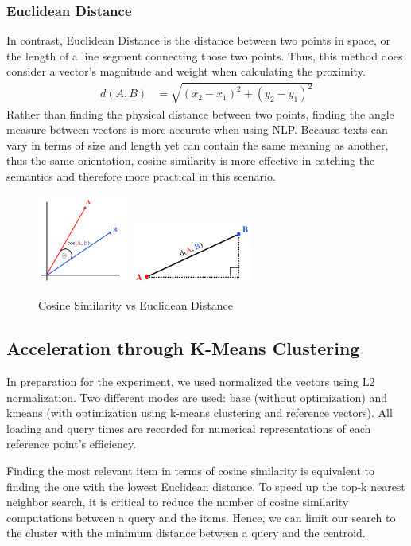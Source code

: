 \documentclass[11pt, a4paper, twocolumn]{article}
\begin{document}
\subsubsection{Euclidean Distance}
In contrast, Euclidean Distance is the distance between two points in space, or the length of a line segment connecting those two points. Thus, this method does consider a vector's magnitude and weight when calculating the proximity.
\begin{align} 
\label{eu}
d(A, B) &= \sqrt{(x_2-x_1)^2 + (y_2-y_1)^2}\nonumber
\end{align}
Rather than finding the physical distance between two points,  finding the angle measure between vectors is more accurate when using NLP. Because texts can vary in terms of size and length yet can contain the same meaning as another, thus the same orientation, cosine similarity is more effective in catching the semantics and therefore more practical in this scenario.
\begin{figure}[htp]
    \centering
    \includegraphics[width=3cm]{cos_sim.png}
    \includegraphics[width=4cm]{eu_dist.png}
    \caption{Cosine Similarity vs Euclidean Distance}
    \label{fig:cos_vs_eu}
\end{figure}
\subsection{Acceleration through K-Means Clustering} 
In preparation for the experiment, we used normalized the vectors using L2 normalization. Two different modes are used: base (without optimization) and kmeans (with optimization using k-means clustering and reference vectors). All loading and query times are recorded for numerical representations of each reference point's efficiency.

Finding the most relevant item in terms of cosine similarity is equivalent to finding the one with the lowest Euclidean distance. To speed up the top-k nearest neighbor search, it is critical to reduce the number of cosine similarity computations between a query and the items. Hence, we can limit our search to the cluster with the minimum distance between a query and the centroid.
\end{document}
